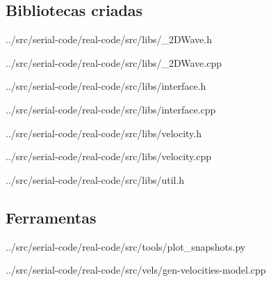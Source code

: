 	\subsection{Bibliotecas criadas}
	     
	     {../src/serial-code/real-code/src/libs/_2DWave.h}
	     
	     
	     {../src/serial-code/real-code/src/libs/_2DWave.cpp}
	     
	     
	     {../src/serial-code/real-code/src/libs/interface.h}
	     
	     
	     {../src/serial-code/real-code/src/libs/interface.cpp}
	     
	     
	     {../src/serial-code/real-code/src/libs/velocity.h}
	     
	     
	     {../src/serial-code/real-code/src/libs/velocity.cpp}

	     
	     {../src/serial-code/real-code/src/libs/util.h}
	
	\subsection{Ferramentas}
	     
	     {../src/serial-code/real-code/src/tools/plot_snapshots.py}

	     
	     {../src/serial-code/real-code/src/vels/gen-velocities-model.cpp}

